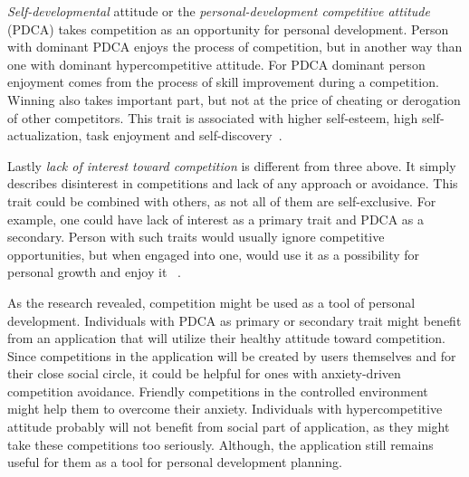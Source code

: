 \textit{Self-developmental} attitude or the \textit{personal-development competitive attitude} (PDCA)
takes competition as an opportunity for personal development.
Person with dominant PDCA enjoys the process of competition, but in another way than one with dominant hypercompetitive
attitude.
For PDCA dominant person enjoyment comes from the process of skill improvement during a competition.
Winning also takes important part, but not at the price of cheating or derogation of other competitors.
This trait is associated with higher self-esteem, high self-actualization, task enjoyment and self-discovery~\cite{cit-ryckman-pdca}.

Lastly \textit{lack of interest toward competition} is different from three above.
It simply describes disinterest in competitions and lack of any approach or avoidance.
This trait could be combined with others, as not all of them are self-exclusive.
For example, one could have lack of interest as a primary trait and PDCA as a secondary.
Person with such traits would usually ignore competitive opportunities, but when engaged into one,
would use it as a possibility for personal growth and enjoy it ~\cite{the-four-faces-of-competetition}.

As the research revealed, competition might be used as a tool of personal development.
Individuals with PDCA as primary or secondary trait might benefit from an application that will utilize their healthy
attitude toward competition.
Since competitions in the application will be created by users themselves and for their close social circle,
it could be helpful for ones with anxiety-driven competition avoidance.
Friendly competitions in the controlled environment might help them to overcome their anxiety.
Individuals with hypercompetitive attitude probably will not benefit from social part of application,
as they might take these competitions too seriously.
Although, the application still remains useful for them as a tool for personal development planning.